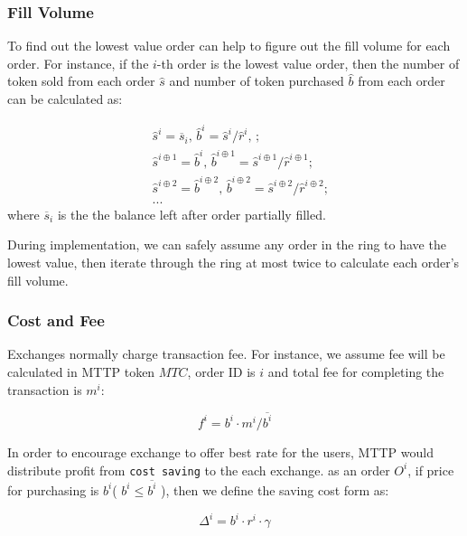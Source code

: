 \documentclass[UTF8,nofonts]{article}
\begin{document}
\subsubsection{Fill Volume\label{sec: matchquantity}}

To find out the lowest value order can help to figure out the fill volume for each order. For instance, if the $i$-th order is the lowest value order, then the number of token sold from each order $\hat{s}$ and number of token purchased $\hat{b}$ from each order can be calculated as:

\[
\begin{split}
&\hat{s}^{i}=\overline{s}_i\text{, } \hat{b}^{i}=\hat{s}^{i}/ \hat{r}^i\text{, }\text{;}\\
&\hat{s}^{i\oplus 1}=\hat{b}^i\text{, } \hat{b}^{i\oplus 1}=\hat{s}^{i\oplus 1}/ \hat{r}^{i\oplus 1}\text{;}\\
&\hat{s}^{i\oplus 2}=\hat{b}^{i\oplus 2}\text{, } \hat{b}^{i\oplus 2}=\hat{s}^{i\oplus 2}/ \hat{r}^{i\oplus 2}\text{;}\\
& ...
\end{split}
\]
where $\overline{s}_i$ is the the balance left after order partially filled.

During implementation, we can safely assume any order in the ring to have the lowest value, then iterate through the ring at most twice to calculate each order's fill volume. 

\subsubsection{Cost and Fee\label{sec: fee}}

Exchanges normally charge transaction fee. For instance,  we assume fee will be calculated in MTTP token $MTC$, order ID is $i$ and total fee for completing the transaction is $m^i$: 

\begin{equation*}
f^i = b^i \cdot m^i / \overline{b^i}
\end{equation*}


In order to encourage exchange to offer best rate for the users,  MTTP would distribute profit from \texttt{cost saving} to the each exchange. as an order $O^i$,  if price for purchasing is $b^i$( $b^i \le \overline{b^i}$ ),  then we define the saving cost form as: 

\begin{equation*}
\Delta^i = b^i \cdot r^i \cdot \gamma
\end{equation*}
\end{document}
